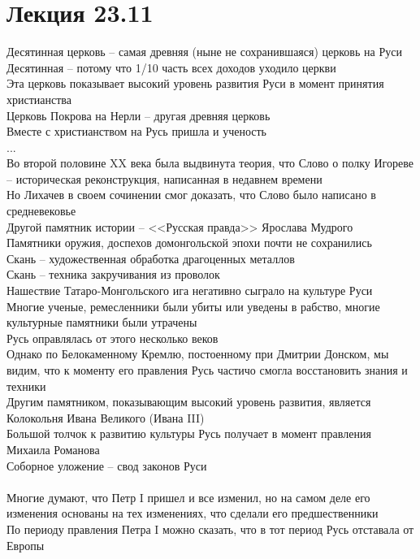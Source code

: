 \documentclass[12pt]{article}
\begin{document}
\section{Лекция 23.11}
Десятинная церковь -- самая древняя (ныне не сохранившаяся) церковь на Руси\\
Десятинная -- потому что 1/10 часть всех доходов уходило церкви\\
Эта церковь показывает высокий уровень развития Руси в момент принятия христианства\\
Церковь Покрова на Нерли -- другая древняя церковь\\
Вместе с христианством на Русь пришла и ученость\\
...\\
Во второй половине XX века была выдвинута теория, что Слово о полку Игореве -- историческая реконструкция, написанная в недавнем времени\\
Но Лихачев в своем сочинении смог доказать, что Слово было написано в средневековье\\
Другой памятник истории -- <<Русская правда>> Ярослава Мудрого\\
Памятники оружия, доспехов домонгольской эпохи почти не сохранились\\
Скань -- художественная обработка драгоценных металлов\\
Скань -- техника закручивания из проволок\\
Нашествие Татаро-Монгольского ига негативно сыграло на культуре Руси\\
Многие ученые, ремесленники были убиты или уведены в рабство, многие культурные памятники были утрачены\\
Русь оправлялась от этого несколько веков\\
Однако по Белокаменному Кремлю, постоенному при Дмитрии Донском, мы видим, что к моменту его правления Русь частичо смогла восстановить знания и техники\\
Другим памятником, показывающим высокий уровень развития, является Колокольня Ивана Великого (Ивана III)\\
Большой толчок к развитию культуры Русь получает в момент правления Михаила Романова\\
Соборное уложение -- свод законов Руси\\\\
Многие думают, что Петр I пришел и все изменил, но на самом деле его изменения основаны на тех изменениях, что сделали его предшественники\\
По периоду правления Петра I можно сказать, что в тот период Русь отставала от Европы\\
\end{document}
